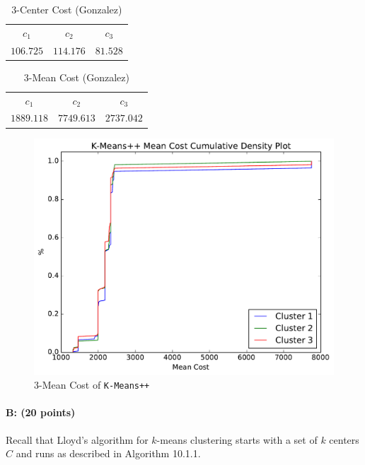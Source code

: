 \documentclass[11pt]{article}
\begin{document}
\begin{table}[H]
\centering
\caption{$3$-Center Cost (Gonzalez)}
\begin{tabular}{c c c}
\hline\hline
$c_{1}$ & $c_{2}$ & $c_{3}$\\
$106.725$ & $114.176$ & $81.528$\\
\hline
\end{tabular}
\end{table}

\begin{table}[H]
\centering
\caption{$3$-Mean Cost (Gonzalez)}
\begin{tabular}{c c c}
\hline\hline
$c_{1}$ & $c_{2}$ & $c_{3}$\\
$1889.118$ & $7749.613$ & $2737.042$\\
\hline
\end{tabular}
\end{table}

\begin{figure}[H]
\centering
\includegraphics[width=.75\textwidth]{cdf.pdf}
\caption{ $3$-Mean Cost of {\tt K-Means++}}
\end{figure}

\paragraph{B: (20 points)}
Recall that Lloyd's algorithm for $k$-means clustering starts with a set of $k$ centers $C$ and runs as described in Algorithm 10.1.1.  
\end{document}
